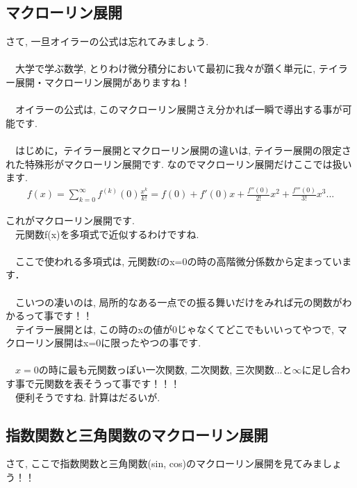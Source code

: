 \documentclass[11pt,a4paper]{ujreport} 	%
\begin{document}
\subsection{マクローリン展開}
さて, 一旦オイラーの公式は忘れてみましょう.\\
\\
　大学で学ぶ数学, とりわけ微分積分において最初に我々が躓く単元に, テイラー展開・マクローリン展開がありますね！\\
\\
　オイラーの公式は, このマクローリン展開さえ分かれば一瞬で導出する事が可能です.\\
\\
　はじめに，テイラー展開とマクローリン展開の違いは, テイラー展開の限定された特殊形がマクローリン展開です. なのでマクローリン展開だけここでは扱います.\\
\begin{eqnarray}
f(x) = \sum_{k=0}^\infty f^{(k)} (0) \frac{x^k}{k!} = f(0) + f'(0)x + \frac{f''(0)}{2!}x^2 + \frac{f'''(0)}{3!}x^3 ...
\end{eqnarray}

これがマクローリン展開です.\\
　元関数f(x)を多項式で近似するわけですね.\\
\\
　ここで使われる多項式は, 元関数fのx=0の時の高階微分係数から定まっています．\\
\\
　こいつの凄いのは, 局所的なある一点での振る舞いだけをみれば元の関数がわかるって事です！！\\
　テイラー展開とは, この時のxの値が0じゃなくてどこでもいいってやつで, マクローリン展開はx=0に限ったやつの事です.\\
\\
　$x=0$の時に最も元関数っぽい一次関数, 二次関数, 三次関数...と$\infty$に足し合わす事で元関数を表そうって事です！！！\\
　便利そうですね. 計算はだるいが.\\
\subsection{指数関数と三角関数のマクローリン展開}
さて, ここで指数関数と三角関数(sin, cos)のマクローリン展開を見てみましょう！！\\
\end{document}
